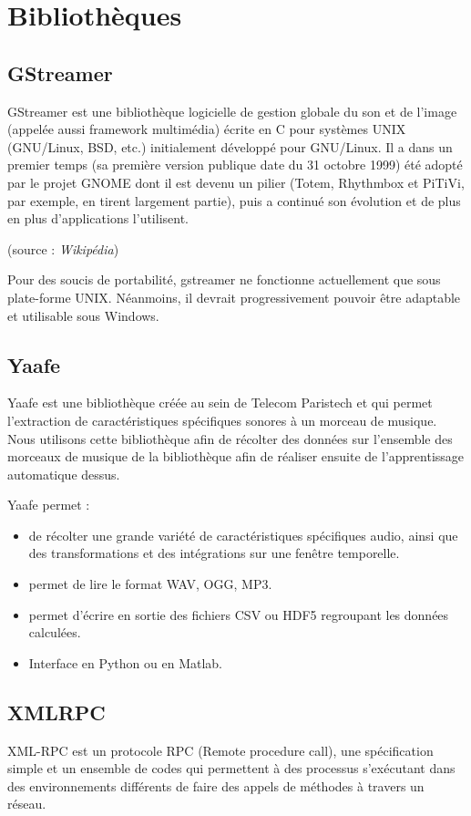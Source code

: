 \documentclass{report}
\begin{document}
\section{Bibliothèques}

\subsection{GStreamer}

GStreamer est une bibliothèque logicielle de gestion globale du son et de l'image (appelée aussi framework multimédia) écrite en C pour systèmes UNIX (GNU/Linux, BSD, etc.) initialement développé pour GNU/Linux. Il a dans un premier temps (sa première version publique date du 31 octobre 1999) été adopté par le projet GNOME dont il est devenu un pilier (Totem, Rhythmbox et PiTiVi, par exemple, en tirent largement partie), puis a continué son évolution et de plus en plus d'applications l'utilisent.

(source : \emph{Wikipédia})

Pour des soucis de portabilité, gstreamer ne fonctionne actuellement que sous plate-forme UNIX. Néanmoins, il devrait progressivement pouvoir être adaptable et utilisable sous Windows.

\subsection{Yaafe}

Yaafe est une bibliothèque créée au sein de Telecom Paristech et qui permet l'extraction de caractéristiques spécifiques sonores à un morceau de musique. Nous utilisons cette bibliothèque afin de récolter des données sur l'ensemble des morceaux de musique de la bibliothèque afin de réaliser ensuite de l'apprentissage automatique dessus.

Yaafe permet :
\begin{itemize}
\item    de récolter une grande variété de caractéristiques spécifiques audio, ainsi que des transformations et des intégrations sur une fenêtre temporelle. 
\item    permet de lire le format WAV, OGG, MP3.
\item    permet d'écrire en sortie des fichiers CSV ou HDF5 regroupant les données calculées.
\item    Interface en Python ou en Matlab.
\end{itemize}


\subsection{XMLRPC}
XML-RPC est un protocole RPC (Remote procedure call), une spécification simple et un ensemble de codes qui permettent à des processus s'exécutant dans des environnements différents de faire des appels de méthodes à travers un réseau.
\end{document}
